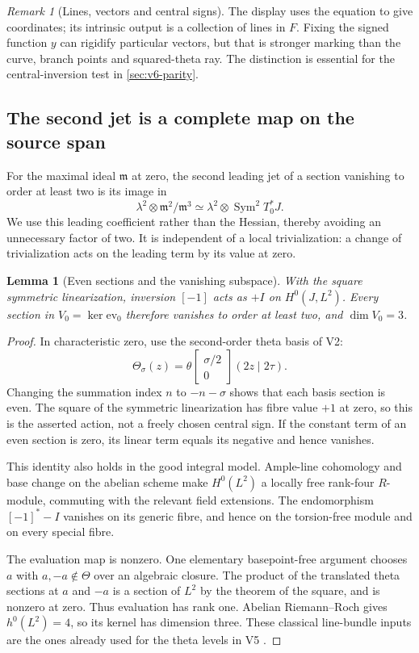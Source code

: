 \documentclass[11pt]{article}
\newtheorem{lemma}[lemma]{Lemma}
\theoremstyle{definition}
\theoremstyle{remark}
\newtheorem{remark}[remark]{Remark}
\begin{document}
\begin{remark}[Lines, vectors and central signs]
The display uses the equation to give coordinates; its intrinsic output
is a collection of lines in $F$. Fixing the signed function $y$ can
rigidify particular vectors, but that is stronger marking than the curve,
branch points and squared-theta ray. The distinction is essential for
the central-inversion test in \cref{sec:v6-parity}.
\end{remark}

\subsection{The second jet is a complete map on the source span}
For the maximal ideal $\mathfrak m$ at zero, the second leading jet of a
section vanishing to order at least two is its image in
\[
 \lambda^2\otimes\mathfrak m^2/\mathfrak m^3
 \simeq\lambda^2\otimes\operatorname{Sym}^2T_0^*J.
\]
We use this leading coefficient rather than the Hessian, thereby avoiding
an unnecessary factor of two. It is independent of a local trivialization:
a change of trivialization acts on the leading term by its value at zero.

\begin{lemma}[Even sections and the vanishing subspace]
\label{lem:v6-even}
With the square symmetric linearization, inversion $[-1]$ acts as $+I$
on $H^0(J,L^2)$. Every section in $V_0=\ker\mathrm{ev}_0$ therefore
vanishes to order at least two, and $\dim V_0=3$.
\end{lemma}
\begin{proof}
In characteristic zero, use the second-order theta basis of V2:
\[
 \Theta_\sigma(z)=
 \theta\!\begin{bmatrix}\sigma/2\\0\end{bmatrix}(2z\mid2\tau).
\]
Changing the summation index $n$ to $-n-\sigma$ shows that each basis
section is even. The square of the symmetric linearization has fibre
value $+1$ at zero, so this is the asserted action, not a freely chosen
central sign. If the constant term of an even section is zero, its
linear term equals its negative and hence vanishes.

This identity also holds in the good integral model. Ample-line
cohomology and base change on the abelian scheme make $H^0(L^2)$ a
locally free rank-four $R$-module, commuting with the relevant field
extensions. The endomorphism $[-1]^*-I$ vanishes on its generic fibre,
and hence on the torsion-free module and on every special fibre.

The evaluation map is nonzero. One elementary basepoint-free argument
chooses $a$ with $a,-a\notin\Theta$ over an algebraic closure.
The product of the translated theta sections at $a$ and $-a$ is a
section of $L^2$ by the theorem of the square, and is nonzero at zero.
Thus evaluation has rank one. Abelian Riemann--Roch gives $h^0(L^2)=4$,
so its kernel has dimension three. These classical line-bundle inputs
are the ones already used for the theta levels in V5 \cite{MilneAV}.
\end{proof}
\end{document}
